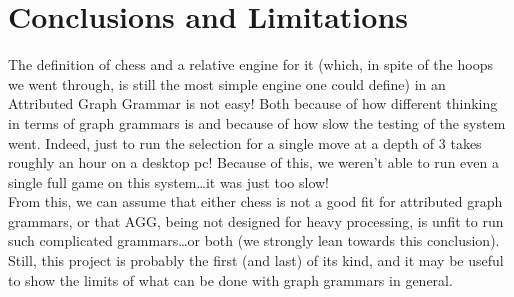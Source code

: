\documentclass[a4paper, 10pt]{scrartcl}
\begin{document}
    \section{Conclusions and Limitations}
    The definition of chess and a relative engine for it (which, in spite of the hoops we went through, is still the most simple engine one could define) in an Attributed Graph Grammar is not easy! Both because of how different thinking in terms of graph grammars is and because of how slow the testing of the system went. Indeed, just to run the selection for a single move at a depth of 3 takes roughly an hour on a desktop pc! Because of this, we weren't able to run even a single full game on this system\dots it was just too slow!\\From this, we can assume that either chess is not a good fit for attributed graph grammars, or that AGG, being not designed for heavy processing, is unfit to run such complicated grammars\dots or both (we strongly lean towards this conclusion). Still, this project is probably the first (and last) of its kind, and it may be useful to show the limits of what can be done with graph grammars in general.
\end{document}
